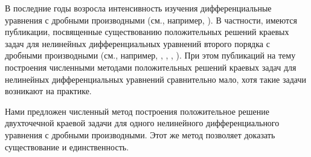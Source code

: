 В последние годы возросла интенсивность изучения дифференциальные уравнения с дробными производными (см., например, \cite{bailu,wangwang,zhangS,qiubai,caballero,changnieto,shangSQ,beyb,beybShab,aleroev}). В частности, имеются публикации, посвященные существованию положительных решений краевых задач для нелинейных дифференциальных уравнений второго порядка с дробными производными (см., например, \cite{bailu,wangwang}, \cite{qiubai,caballero,changnieto}, \cite{beyb}, \cite{beybDavud}). При этом публикаций на тему построения численными методами положительных решений краевых задач для нелинейных дифференциальных уравнений сравнительно мало, хотя такие задачи возникают на практике.

Нами предложен численный метод построения положительное решение двухточечной краевой задачи для одного нелинейного дифференциального уравнения с дробными производными. Этот же метод позволяет доказать существование и единственность.
